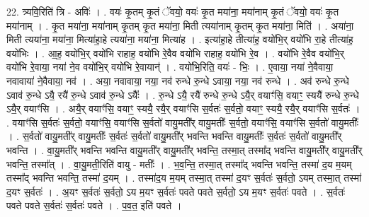 \documentclass[17pt]{extarticle}
\begin{document}
22. त्र्यवि॒रिति॑ त्रि - अविः॑ । . वयः॑ कृ॒तम् कृ॒तं ॅवयो॒ वयः॑ कृ॒त मया॑ना॒ मया॑नाम् कृ॒तं ॅवयो॒ वयः॑ कृ॒त मया॑नाम् । . कृ॒त मया॑ना॒ मया॑नाम् कृ॒तम् कृ॒त मया॑ना॒ मिती त्यया॑नाम् कृ॒तम् कृ॒त मया॑ना॒ मिति॑ । . अया॑ना॒ मिती त्यया॑ना॒ मया॑ना॒ मित्या॑हा॒हे त्यया॑ना॒ मया॑ना॒ मित्या॑ह । . इत्या॑हा॒हे तीत्या॑ह॒ वयो॑भि॒र् वयो॑भि रा॒हे तीत्या॑ह॒ वयो॑भिः । . आ॒ह॒ वयो॑भि॒र् वयो॑भि राहाह॒ वयो॑भि रे॒वैव वयो॑भि राहाह॒ वयो॑भि रे॒व । . वयो॑भि रे॒वैव वयो॑भि॒र् वयो॑भि रे॒वाया॒ नया॑ ने॒व वयो॑भि॒र् वयो॑भि रे॒वायान्॑ । . वयो॑भि॒रिति॒ वयः॑ - भिः॒ । . ए॒वाया॒ नया॑ ने॒वैवाया॒ नवावाया॑ ने॒वैवाया॒ नव॑ । . अया॒ नवावाया॒ नया॒ नव॑ रुन्धे रु॒न्धे ऽवाया॒ नया॒ नव॑ रुन्धे । . अव॑ रुन्धे रु॒न्धे ऽवाव॑ रु॒न्धे ऽयै॒ रयै॑ रु॒न्धे ऽवाव॑ रु॒न्धे ऽयैः᳚ । . रु॒न्धे ऽयै॒ रयै॑ रुन्धे रु॒न्धे ऽयै॒र् वयाꣳ॑सि॒ वयाꣳ॒॒ स्ययै॑ रुन्धे रु॒न्धे ऽयै॒र् वयाꣳ॑सि । . अयै॒र् वयाꣳ॑सि॒ वयाꣳ॒॒ स्ययै॒ रयै॒र् वयाꣳ॑सि स॒र्वतः॑ स॒र्वतो॒ वयाꣳ॒॒ स्ययै॒ रयै॒र् वयाꣳ॑सि स॒र्वतः॑ । . वयाꣳ॑सि स॒र्वतः॑ स॒र्वतो॒ वयाꣳ॑सि॒ वयाꣳ॑सि स॒र्वतो॑ वायु॒मती᳚र् वायु॒मतीः᳚ स॒र्वतो॒ वयाꣳ॑सि॒ वयाꣳ॑सि स॒र्वतो॑ वायु॒मतीः᳚ । . स॒र्वतो॑ वायु॒मती᳚र् वायु॒मतीः᳚ स॒र्वतः॑ स॒र्वतो॑ वायु॒मती᳚र् भवन्ति भवन्ति वायु॒मतीः᳚ स॒र्वतः॑ स॒र्वतो॑ वायु॒मती᳚र् भवन्ति । . वा॒यु॒मती᳚र् भवन्ति भवन्ति वायु॒मती᳚र् वायु॒मती᳚र् भवन्ति॒ तस्मा॒त् तस्मा᳚द् भवन्ति वायु॒मती᳚र् वायु॒मती᳚र् भवन्ति॒ तस्मा᳚त् । . वा॒यु॒मती॒रिति॑ वायु - मतीः᳚ । . भ॒व॒न्ति॒ तस्मा॒त् तस्मा᳚द् भवन्ति भवन्ति॒ तस्मा॑ द॒य म॒यम् तस्मा᳚द् भवन्ति भवन्ति॒ तस्मा॑ द॒यम् । . तस्मा॑द॒य म॒यम् तस्मा॒त् तस्मा॑ द॒यꣳ स॒र्वतः॑ स॒र्वतो॒ ऽयम् तस्मा॒त् तस्मा॑ द॒यꣳ स॒र्वतः॑ । . अ॒यꣳ स॒र्वतः॑ स॒र्वतो॒ ऽय म॒यꣳ स॒र्वतः॑ पवते पवते स॒र्वतो॒ ऽय म॒यꣳ स॒र्वतः॑ पवते । . स॒र्वतः॑ पवते पवते स॒र्वतः॑ स॒र्वतः॑ पवते । . प॒व॒त॒ इति॑ पवते । \newline
\pagebreak
{}
\end{document}
